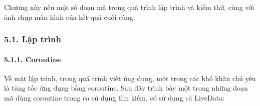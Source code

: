 \documentclass[
]{article}
\begin{document}
Chương này nêu một số đoạn mã trong quá trình lập trình và kiểm thử,
cùng với ảnh chụp màn hình của kết quả cuối cùng.

\hypertarget{lux1eadp-truxecnh}{%
\subsubsection{\texorpdfstring{5.1. Lập trình
}{5.1. Lập trình }}\label{lux1eadp-truxecnh}}

\hypertarget{coroutine-1}{%
\paragraph{5.1.1. Coroutine}\label{coroutine-1}}

Về mặt lập trình, trong quá trình viết ứng dụng, một trong các khó khăn
chủ yếu là tăng tốc ứng dụng bằng coroutine. Sau đây trình bày một trong
những đoạn mã dùng coroutine trong ca sử dụng tìm kiếm, có sử dụng cả
LiveData:
\end{document}
